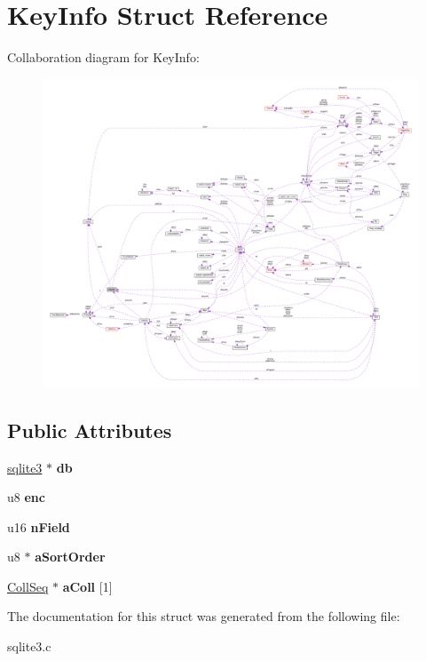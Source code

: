 \hypertarget{struct_key_info}{\section{Key\-Info Struct Reference}
\label{struct_key_info}
}


Collaboration diagram for Key\-Info\-:\nopagebreak
\begin{figure}[H]
\begin{center}
\leavevmode
\includegraphics[width=350pt]{struct_key_info__coll__graph}
\end{center}
\end{figure}
\subsection*{Public Attributes}
\begin{DoxyCompactItemize}
\item 
\hypertarget{struct_key_info_af2e7a3a411f5ca1ccf6de77d320b59db}{\hyperlink{structsqlite3}{sqlite3} $\ast$ {\bfseries db}}\label{struct_key_info_af2e7a3a411f5ca1ccf6de77d320b59db}

\item 
\hypertarget{struct_key_info_a37972825f9a148668e979be12465e832}{u8 {\bfseries enc}}\label{struct_key_info_a37972825f9a148668e979be12465e832}

\item 
\hypertarget{struct_key_info_af70436487a95e445d540bfc4ca1d3f0b}{u16 {\bfseries n\-Field}}\label{struct_key_info_af70436487a95e445d540bfc4ca1d3f0b}

\item 
\hypertarget{struct_key_info_ac5fe4bd0172a1f11f41f678528a7b21e}{u8 $\ast$ {\bfseries a\-Sort\-Order}}\label{struct_key_info_ac5fe4bd0172a1f11f41f678528a7b21e}

\item 
\hypertarget{struct_key_info_ad43aa024fca5a065e75d8e24b231adcb}{\hyperlink{struct_coll_seq}{Coll\-Seq} $\ast$ {\bfseries a\-Coll} \mbox{[}1\mbox{]}}\label{struct_key_info_ad43aa024fca5a065e75d8e24b231adcb}

\end{DoxyCompactItemize}


The documentation for this struct was generated from the following file\-:\begin{DoxyCompactItemize}
\item 
sqlite3.\-c\end{DoxyCompactItemize}
